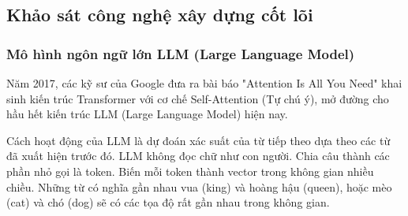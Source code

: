 \subsection{Khảo sát công nghệ xây dựng cốt lõi}
\subsubsection{Mô hình ngôn ngữ lớn LLM (Large Language Model)}

Năm 2017, các kỹ sư của Google
đưa ra bài báo "Attention Is All You Need"
khai sinh kiến trúc Transformer
với cơ chế Self-Attention (Tự chú ý),
mở đường cho hầu hết kiến trúc
LLM (Large Language Model) hiện nay.

Cách hoạt động của LLM
là dự đoán xác suất của từ tiếp theo
dựa theo các từ đã xuất hiện trước đó.
LLM không đọc chữ như con người.
Chia câu thành các phần nhỏ gọi là token.
Biến mỗi token thành vector
trong không gian nhiều chiều.
Những từ có nghĩa gần nhau
vua (king) và hoàng hậu (queen), hoặc mèo (cat) và chó (dog)
sẽ có các tọa độ rất gần nhau trong không gian.







